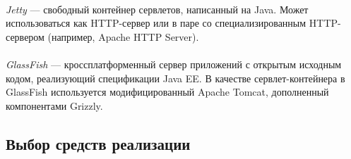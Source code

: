 \paragraph{}
\textit{Jetty} --- свободный контейнер сервлетов, написанный на Java. Может использоваться
как HTTP-сервер или в паре со специализированным HTTP-сервером (например, Apache HTTP Server).

\paragraph{}
\textit{GlassFish} --- кроссплатформенный сервер приложений с открытым исходным кодом,
реализующий спецификации Java EE. В качестве сервлет-контейнера в GlassFish используется
модифицированный Apache Tomcat, дополненный компонентами Grizzly.


\newpage
\subsection{Выбор средств реализации}
\label{sub:choice_results}

\pagebreak
